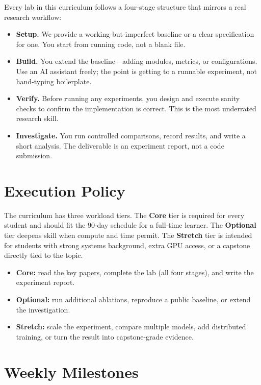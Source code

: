 Every lab in this curriculum follows a four-stage structure that mirrors a real research workflow:

\begin{itemize}
    \item \textbf{Setup.} We provide a working-but-imperfect baseline or a clear specification for one. You start from running code, not a blank file.
    \item \textbf{Build.} You extend the baseline---adding modules, metrics, or configurations. Use an AI assistant freely; the point is getting to a runnable experiment, not hand-typing boilerplate.
    \item \textbf{Verify.} Before running any experiments, you design and execute sanity checks to confirm the implementation is correct. This is the most underrated research skill.
    \item \textbf{Investigate.} You run controlled comparisons, record results, and write a short analysis. The deliverable is an experiment report, not a code submission.
\end{itemize}

\chapter*{Execution Policy}

The curriculum has three workload tiers. The \textbf{Core} tier is required for every student and should fit the 90-day schedule for a full-time learner. The \textbf{Optional} tier deepens skill when compute and time permit. The \textbf{Stretch} tier is intended for students with strong systems background, extra GPU access, or a capstone directly tied to the topic.

\begin{itemize}
    \item \textbf{Core:} read the key papers, complete the lab (all four stages), and write the experiment report.
    \item \textbf{Optional:} run additional ablations, reproduce a public baseline, or extend the investigation.
    \item \textbf{Stretch:} scale the experiment, compare multiple models, add distributed training, or turn the result into capstone-grade evidence.
\end{itemize}

\chapter*{Weekly Milestones}

